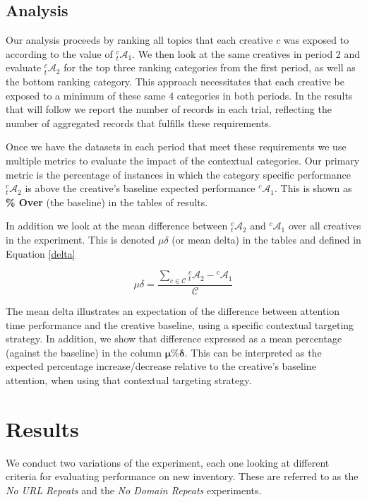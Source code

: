\documentclass[sigconf]{acmart}
\begin{document}
\subsection{Analysis}

Our analysis proceeds by ranking all topics that each creative $c$ was exposed
to according to the value of ${}^c_t\mathcal{A}_1$.
We then look at the same creatives in period 2 and
evaluate ${}^c_t\mathcal{A}_2$ for the top three ranking categories from the first period,
as well as the bottom ranking category.
This approach necessitates that each creative be exposed to a minimum
of these same 4 categories in both periods.
In the results that will follow we report the number
of records in each trial, reflecting the number of aggregated records
that fulfills these requirements.

Once we have the datasets in each period that meet these requirements we use multiple metrics
to evaluate the impact of the contextual categories. Our primary metric is the percentage
of instances in which the category specific performance ${}^c_t\mathcal{A}_2$ is above the
creative's baseline expected performance ${}^c\mathcal{A}_1$.
This is shown as \textbf{\% Over} (the baseline) in the tables of results.

In addition we look at the mean difference between ${}^c_t\mathcal{A}_2$ and ${}^c\mathcal{A}_1$
over all creatives in the experiment. This is denoted \boldmath$\mu\delta$ (or mean delta) in
the tables and defined in Equation \ref{delta}

\begin{equation}
\label{delta}
\mu\delta = \frac{ \sum_{c \in \mathcal{C}} {}^c_t\mathcal{A}_2 - {}^c\mathcal{A}_1 }{ \mathcal{C} }
\end{equation}

The mean delta illustrates an expectation of the difference between attention time performance
and the creative baseline, using a specific contextual targeting strategy. In addition, we show
that difference expressed as a mean percentage (against the baseline) in the column
$\mathbf{\mu\%\delta}$. This can be interpreted as the expected percentage increase/decrease
relative to the creative's baseline attention, when using that contextual targeting strategy.


\section{Results}

We conduct two variations of the experiment, each one looking at different
criteria for evaluating performance on new inventory.
These are referred to as the
\emph{No URL Repeats} and the \emph{No Domain Repeats} experiments.
\end{document}
